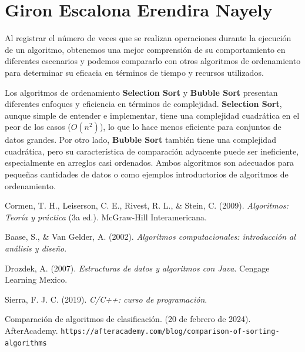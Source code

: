 \documentclass[12pt]{article}
\begin{document}
\section{Giron Escalona Erendira Nayely}
Al registrar el número de veces que se realizan operaciones durante la ejecución de un algoritmo, obtenemos una mejor comprensión de su comportamiento en diferentes escenarios y podemos compararlo con otros algoritmos de ordenamiento para determinar su eficacia en términos de tiempo y recursos utilizados.
\par\vspace{0.4cm}
Los algoritmos de ordenamiento \textbf{Selection Sort} y \textbf{Bubble Sort}  presentan diferentes enfoques y eficiencia en términos de complejidad. \textbf{Selection Sort}, aunque simple de entender e implementar, tiene una complejidad cuadrática en el peor de los casos (\(O(n^2)\)), lo que lo hace menos eficiente para conjuntos de datos grandes. Por otro lado, \textbf{Bubble Sort} también tiene una complejidad cuadrática, pero su característica de comparación adyacente puede ser ineficiente, especialmente en arreglos casi ordenados. Ambos algoritmos son adecuados para pequeñas cantidades de datos o como ejemplos introductorios de algoritmos de ordenamiento.
\par\vspace{1cm}
\newpage
\begin{thebibliography}{9}
    Cormen, T. H., Leiserson, C. E., Rivest, R. L., \& Stein, C. (2009). 
    \textit{Algoritmos: Teoría y práctica} (3a ed.). 
    McGraw-Hill Interamericana.
    
    Baase, S., \& Van Gelder, A. (2002). 
    \textit{Algoritmos computacionales: introducción al análisis y diseño}.
    
    Drozdek, A. (2007). 
    \textit{Estructuras de datos y algoritmos con Java}. 
    Cengage Learning Mexico.
    
    Sierra, F. J. C. (2019). 
    \textit{C/C++: curso de programación}.
    
    Comparación de algoritmos de clasificación. (20 de febrero de 2024). 
    AfterAcademy. 
    \texttt{https://afteracademy.com/blog/comparison-of-sorting-algorithms}
    \end{thebibliography}
\end{document}

